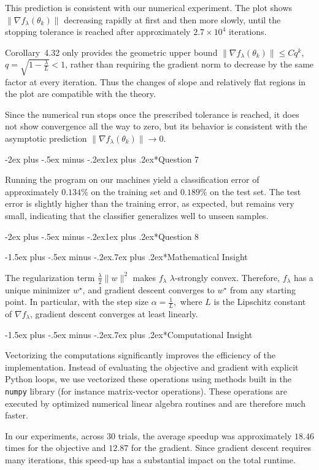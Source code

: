 \documentclass[11pt,a4paper]{article}
\makeatletter
\renewcommand\section{\@startsection{section}{1}{\z@}%
  {-2ex plus -.5ex minus -.2ex}{1ex plus .2ex}{\normalfont\Large\bfseries}}
\renewcommand\subsection{\@startsection{subsection}{2}{\z@}%
  {-1.5ex plus -.5ex minus -.2ex}{.7ex plus .2ex}{\normalfont\large\bfseries}}
\makeatother
\begin{document}
This prediction is consistent with our numerical experiment. The plot
shows \(\|\nabla f_\lambda(\theta_k)\|\) decreasing rapidly at first and
then more slowly, until the stopping tolerance is reached after
approximately \(2.7\times10^4\) iterations.

Corollary~4.32 only provides the geometric upper bound
$\|\nabla f_\lambda(\theta_k)\| \leq Cq^k$,
$q=\sqrt{1-\frac{\lambda}{L}}<1$,
rather than requiring the gradient norm to decrease by the same factor
at every iteration. Thus the changes of slope and relatively flat
regions in the plot are compatible with the theory.

Since the numerical run stops once the prescribed tolerance is reached,
it does not show convergence all the way to zero, but its behavior is
consistent with the asymptotic prediction
$\|\nabla f_\lambda(\theta_k)\|\to 0$.

\section*{Question 7}

Running the program on our machines yield a classification error of approximately \(0.134\%\) on the training set and \(0.189\%\) on the test set. The test error is slightly higher than the training error, as expected, but remains very small, indicating that the classifier generalizes well to unseen samples.

\section*{Question 8}

\subsection*{Mathematical Insight}

The regularization term
\(\frac{\lambda}{2}\|w\|^2\)
makes \(f_\lambda\) \(\lambda\)-strongly convex. Therefore, \(f_\lambda\) has a unique minimizer \(w^\star\), and gradient descent converges to \(w^\star\) from any starting point. In particular, with the step size
\(\alpha=\frac{1}{L},\)
where \(L\) is the Lipschitz constant of \(\nabla f_\lambda\), gradient descent converges at least linearly.

\subsection*{Computational Insight}

Vectorizing the computations significantly improves the efficiency of
the implementation. Instead of evaluating the objective and gradient
with explicit Python loops, we use vectorized these operations using methods built in the \texttt{numpy} library (for instance matrix-vector operations).
These operations are executed by optimized numerical linear algebra
routines and are therefore much faster.

In our experiments, across $30$ trials, the average speedup was approximately $18.46$ times for the objective and $12.87$ for the gradient. Since gradient
descent requires many iterations, this speed-up has a substantial impact on the total runtime.
\end{document}
